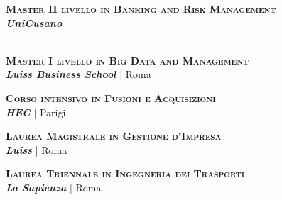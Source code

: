 
\textsc{\textbf{Master II livello in Banking and Risk Management}} \\ 
\textbf{\textit{UniCusano}} %
\\
 \\

\is
\textsc{\textbf{Master I livello in Big Data and Management}} \\ 
\textbf{\textit{Luiss Business School}} | Roma  %
\\

\is
\textsc{\textbf{Corso intensivo in Fusioni e Acquisizioni}} \\ 
\textbf{\textit{HEC}} | Parigi  %

\is
\textsc{\textbf{Laurea Magistrale in Gestione d'Impresa}} \\ 
\textbf{\textit{Luiss}} | Roma  %
\\

\is
\textsc{\textbf{Laurea Triennale in Ingegneria dei Trasporti}} \\ 
\textbf{\textit{La Sapienza}} | Roma  %
\\
